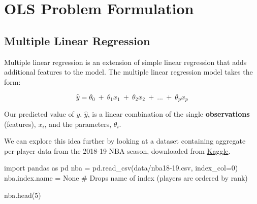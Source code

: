 \documentclass[
  letterpaper,
  DIV=11,
  numbers=noendperiod]{scrreprt}
\newenvironment{Shaded}{\begin{snugshade}}{\end{snugshade}}
\newcommand{\CommentTok}[1]{\textcolor[rgb]{0.37,0.37,0.37}{#1}}
\newcommand{\DecValTok}[1]{\textcolor[rgb]{0.68,0.00,0.00}{#1}}
\newcommand{\ImportTok}[1]{\textcolor[rgb]{0.00,0.46,0.62}{#1}}
\newcommand{\NormalTok}[1]{\textcolor[rgb]{0.00,0.23,0.31}{#1}}
\newcommand{\OperatorTok}[1]{\textcolor[rgb]{0.37,0.37,0.37}{#1}}
\newcommand{\StringTok}[1]{\textcolor[rgb]{0.13,0.47,0.30}{#1}}
\newcommand{\VariableTok}[1]{\textcolor[rgb]{0.07,0.07,0.07}{#1}}
\begin{document}
\section{OLS Problem Formulation}\label{ols-problem-formulation}

\subsection{Multiple Linear
Regression}\label{multiple-linear-regression-1}

Multiple linear regression is an extension of simple linear regression
that adds additional features to the model. The multiple linear
regression model takes the form:

\[\hat{y} = \theta_0\:+\:\theta_1x_{1}\:+\:\theta_2 x_{2}\:+\:...\:+\:\theta_p x_{p}\]

Our predicted value of \(y\), \(\hat{y}\), is a linear combination of
the single \textbf{observations} (features), \(x_i\), and the
parameters, \(\theta_i\).

We can explore this idea further by looking at a dataset containing
aggregate per-player data from the 2018-19 NBA season, downloaded from
\href{https://www.kaggle.com/schmadam97/nba-regular-season-stats-20182019}{Kaggle}.

\begin{Shaded}
\begin{Highlighting}[]
\ImportTok{import}\NormalTok{ pandas }\ImportTok{as}\NormalTok{ pd}
\NormalTok{nba }\OperatorTok{=}\NormalTok{ pd.read\_csv(}\StringTok{\textquotesingle{}data/nba18{-}19.csv\textquotesingle{}}\NormalTok{, index\_col}\OperatorTok{=}\DecValTok{0}\NormalTok{)}
\NormalTok{nba.index.name }\OperatorTok{=} \VariableTok{None} \CommentTok{\# Drops name of index (players are ordered by rank)}
\end{Highlighting}
\end{Shaded}

\begin{Shaded}
\begin{Highlighting}[]
\NormalTok{nba.head(}\DecValTok{5}\NormalTok{)}
\end{Highlighting}
\end{Shaded}
\end{document}
